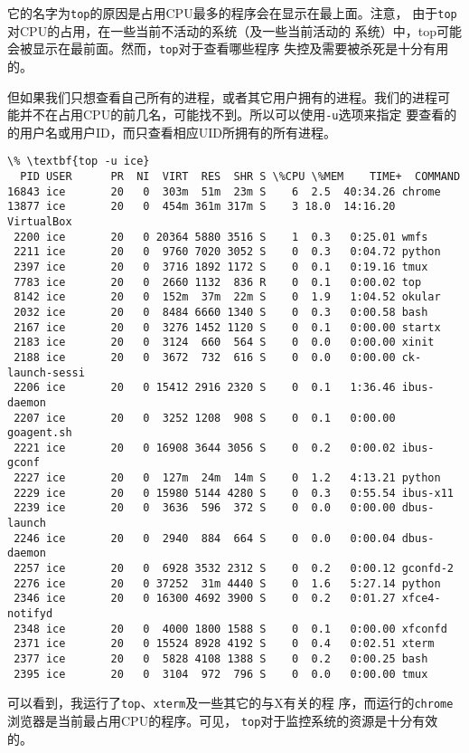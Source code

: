 它的名字为\texttt{top}的原因是占用CPU最多的程序会在显示在最上面。注意，
由于\texttt{top}对CPU的占用，在一些当前不活动的系统（及一些当前活动的
系统）中，top可能会被显示在最前面。然而，\texttt{top}对于查看哪些程序
失控及需要被杀死是十分有用的。

但如果我们只想查看自己所有的进程，或者其它用户拥有的进程。我们的进程可
能并不在占用CPU的前几名，可能找不到。所以可以使用\texttt{-u}选项来指定
要查看的的用户名或用户ID，而只查看相应UID所拥有的所有进程。
\begin{Verbatim}[frame=single, commandchars=\\\{\}]
\% \textbf{top -u ice}
  PID USER      PR  NI  VIRT  RES  SHR S \%CPU \%MEM    TIME+  COMMAND            
16843 ice       20   0  303m  51m  23m S    6  2.5  40:34.26 chrome
13877 ice       20   0  454m 361m 317m S    3 18.0  14:16.20 VirtualBox
 2200 ice       20   0 20364 5880 3516 S    1  0.3   0:25.01 wmfs
 2211 ice       20   0  9760 7020 3052 S    0  0.3   0:04.72 python
 2397 ice       20   0  3716 1892 1172 S    0  0.1   0:19.16 tmux
 7783 ice       20   0  2660 1132  836 R    0  0.1   0:00.02 top
 8142 ice       20   0  152m  37m  22m S    0  1.9   1:04.52 okular
 2032 ice       20   0  8484 6660 1340 S    0  0.3   0:00.58 bash
 2167 ice       20   0  3276 1452 1120 S    0  0.1   0:00.00 startx
 2183 ice       20   0  3124  660  564 S    0  0.0   0:00.00 xinit
 2188 ice       20   0  3672  732  616 S    0  0.0   0:00.00 ck-launch-sessi
 2206 ice       20   0 15412 2916 2320 S    0  0.1   1:36.46 ibus-daemon
 2207 ice       20   0  3252 1208  908 S    0  0.1   0:00.00 goagent.sh
 2221 ice       20   0 16908 3644 3056 S    0  0.2   0:00.02 ibus-gconf
 2227 ice       20   0  127m  24m  14m S    0  1.2   4:13.21 python
 2229 ice       20   0 15980 5144 4280 S    0  0.3   0:55.54 ibus-x11
 2239 ice       20   0  3636  596  372 S    0  0.0   0:00.00 dbus-launch
 2246 ice       20   0  2940  884  664 S    0  0.0   0:00.04 dbus-daemon
 2257 ice       20   0  6928 3532 2312 S    0  0.2   0:00.12 gconfd-2
 2276 ice       20   0 37252  31m 4440 S    0  1.6   5:27.14 python
 2346 ice       20   0 16300 4692 3900 S    0  0.2   0:01.27 xfce4-notifyd
 2348 ice       20   0  4000 1800 1588 S    0  0.1   0:00.00 xfconfd
 2371 ice       20   0 15524 8928 4192 S    0  0.4   0:02.51 xterm
 2377 ice       20   0  5828 4108 1388 S    0  0.2   0:00.25 bash
 2395 ice       20   0  3104  972  796 S    0  0.0   0:00.00 tmux
\end{Verbatim}
可以看到，我运行了\texttt{top}、\texttt{xterm}及一些其它的与X有关的程
序，而运行的\texttt{chrome}浏览器是当前最占用CPU的程序。可见，
\texttt{top}对于监控系统的资源是十分有效的。

